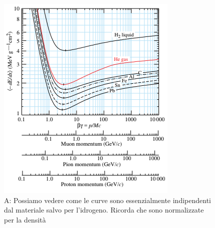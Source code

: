 \begin{minipage}{0.48\textwidth}
    \begin{figure}[H]
        \centering
        \includegraphics[width=\textwidth,frame]{Chapters/images/Interazione_radiazione_materia/image-20220214175355949.png}
        \captionsetup{width=\textwidth}
        \caption{A: Possiamo vedere come le curve sono essenzialmente indipendenti dal materiale salvo per l'idrogeno. Ricorda che sono normalizzate per la densità}
        \label{fig:}
    \end{figure}
\end{minipage} \hfill
